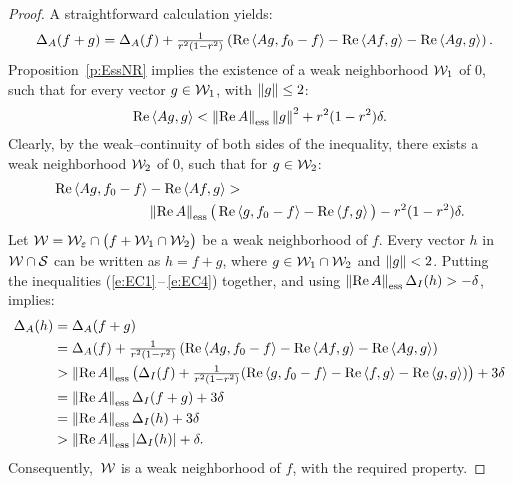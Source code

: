 \begin{proof}
A straightforward calculation yields:
\begin{equation}\label{e:EC2} ~
  ~\Delta_A(f+g) = \Delta_A(f) + \tfrac{1}{r^2(1-r^2)}\left(
   \RE\seq{A g,f_0-f} - \RE\seq{A f,g} - \RE\seq{A g,g} \right).
\end{equation}
Proposition~\ref{p:EssNR} implies the existence of a weak neighborhood ${\cal W}_1$
of $0$, such that for every vector $g\in{\cal W}_1$, with $\left\Vert g\right\Vert\leq2$:
\begin{equation}\label{e:EC3}
  \RE\seq{A g,g} < \essnorm{\RE{}A} \norm{g}^2 + r^2(1-r^2)\delta.
\end{equation}
Clearly, by the weak--continuity of both sides of the inequality, there
exists a weak neighborhood ${\cal W}_2$ of $0$, such that for $g\in{\cal W}_2$:
\begin{equation}\label{e:EC4}
  \begin{split}
    \RE\seq{A g,f_0-f} & - \RE\seq{A f,g} > \\
     & \essnorm{\RE{}A}\big(\RE\seq{g,f_0-f}-\RE\seq{f,g}\big)
       -r^2(1-r^2)\delta.
  \end{split}
\end{equation}
Let ${\cal W} = {\cal W}_\varepsilon\cap\big(f + {\cal W}_1\cap{\cal W}_2\big)$ be a weak neighborhood of
$f$. Every vector $h$ in ${\cal W}\cap{\cal S}$ can be written as $h=f+g$, where $g \in
{\cal W}_1\cap{\cal W}_2$ and $\left\Vert g\right\Vert<2$. Putting the inequalities
(\ref{e:EC1}\,--\,\ref{e:EC4}) together, and using $\essnorm{\RE{}A}
\Delta_I(h) > -\delta$, implies:
\begin{equation*}
  \begin{split}
   \Delta_A(h) &= \Delta_A(f+g)\\
   &= \Delta_A(f) + \tfrac{1}{r^2(1-r^2)}\left(
        \RE\seq{A g,f_0-f} - \RE\seq{A f,g} - \RE\seq{A g,g}\right)\\
   &> \essnorm{\RE{}A}\big( \Delta_I(f) + \tfrac{1}{r^2(1-r^2)}(
        \RE\seq{g,f_0-f} - \RE\seq{f,g} - \RE\seq{g,g})\big) + 3\delta\\
   &= \essnorm{\RE{}A} \Delta_I(f+g) + 3\delta\\
   &= \essnorm{\RE{}A} \Delta_I(h) + 3\delta\\
   &> \essnorm{\RE{}A} \abs{\Delta_I(h)} + \delta.
  \end{split}
\end{equation*}
Consequently,\, ${\cal W}$ is a weak neighborhood of $f$, with the required
property.
\end{proof}

\goodbreak
